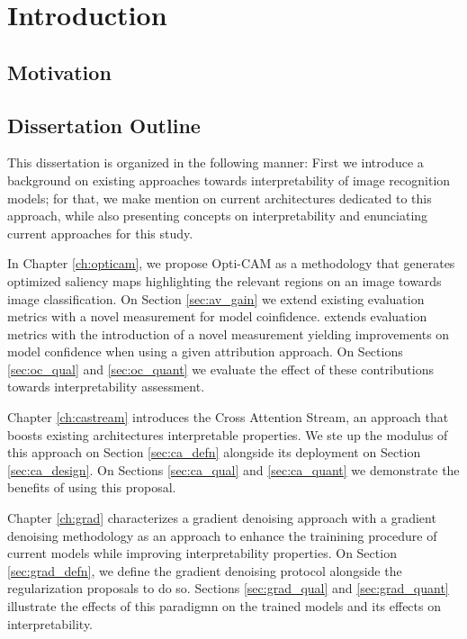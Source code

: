     \chapter*{Introduction}
    \chaptertoc{}

    \section*{Motivation}

    \section*{Dissertation Outline}
    This dissertation is organized in the following manner: First
    we introduce a background on existing approaches towards interpretability of image
    recognition models; for that, we make mention on current architectures dedicated 
    to this approach, while also presenting concepts on interpretability and enunciating 
    current approaches for this study. 

    In Chapter \ref{ch:opticam}, we propose Opti-CAM as a methodology that generates 
    optimized saliency maps highlighting the relevant regions on an image towards image
    classification. On Section \ref{sec:av_gain} we extend existing evaluation metrics 
    with a novel measurement for model coinfidence. extends evaluation metrics with the 
    introduction of a novel measurement yielding improvements on model confidence 
    when using a given attribution approach. On Sections \ref{sec:oc_qual} and \ref{sec:oc_quant} 
    we evaluate the effect of these contributions towards interpretability assessment.
    
    Chapter \ref{ch:castream} introduces the Cross Attention Stream, an approach that boosts
     existing architectures interpretable properties. We ste up the modulus of this approach 
    on Section \ref{sec:ca_defn} alongside its deployment on Section \ref{sec:ca_design}. 
    On Sections \ref{sec:ca_qual} and \ref{sec:ca_quant} we demonstrate the benefits 
    of using this proposal.
    
    Chapter \ref{ch:grad} characterizes a gradient denoising approach with a gradient denoising
     methodology as an approach to enhance the trainining procedure of current
    models while improving interpretability properties. On Section \ref{sec:grad_defn}, 
    we define the gradient denoising protocol alongside the regularization proposals to do so.
    Sections \ref{sec:grad_qual} and \ref{sec:grad_quant} illustrate the effects of this paradigmn
    on the trained models and its effects on interpretability.
    
